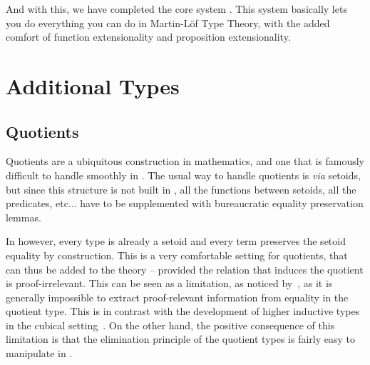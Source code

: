 And with this, we have completed the core system \SetoidCC.
% 
This system basically lets you do everything you can do in Martin-Löf Type 
Theory, with the added comfort of function extensionality and proposition
extensionality.

\section{Additional Types}
\label{sec:extensions}

\subsection{Quotients}

Quotients are a ubiquitous construction in mathematics, and one that
is famously difficult to handle smoothly in \MLTT.
%
The usual way to handle quotients is \textit{via} setoids, but since
this structure is not built in \MLTT, all the functions between
setoids, all the predicates, etc... have to be supplemented with
bureaucratic equality preservation lemmas.

In \SetoidCC however, every type is already a setoid and every term
preserves the setoid equality by construction. This is a very
comfortable setting for quotients, that can thus be added to the
theory -- provided the relation that induces the quotient is
proof-irrelevant.
%
This can be seen as a limitation, as noticed
by~, as it is generally
impossible to extract proof-relevant information from equality in
the quotient type. This is in contrast with the development of higher
inductive types in the cubical setting~.
%
On the other hand, the positive consequence of this limitation is
that the elimination principle of the quotient types is fairly easy to
manipulate in \SetoidCC.

